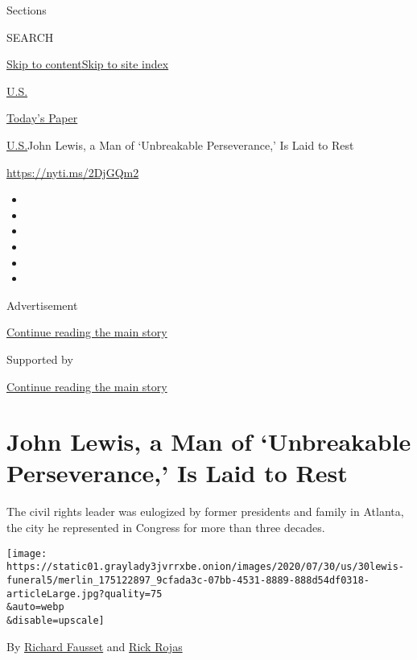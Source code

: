 Sections

SEARCH

\protect\hyperlink{site-content}{Skip to
content}\protect\hyperlink{site-index}{Skip to site index}

\href{https://www.nytimes3xbfgragh.onion/section/us}{U.S.}

\href{https://myaccount.nytimes3xbfgragh.onion/auth/login?response_type=cookie\&client_id=vi}{}

\href{https://www.nytimes3xbfgragh.onion/section/todayspaper}{Today's
Paper}

\href{/section/us}{U.S.}\textbar{}John Lewis, a Man of `Unbreakable
Perseverance,' Is Laid to Rest

\href{https://nyti.ms/2DjGQm2}{https://nyti.ms/2DjGQm2}

\begin{itemize}
\item
\item
\item
\item
\item
\item
\end{itemize}

Advertisement

\protect\hyperlink{after-top}{Continue reading the main story}

Supported by

\protect\hyperlink{after-sponsor}{Continue reading the main story}

\hypertarget{john-lewis-a-man-of-unbreakable-perseverance-is-laid-to-rest}{%
\section{John Lewis, a Man of `Unbreakable Perseverance,' Is Laid to
Rest}\label{john-lewis-a-man-of-unbreakable-perseverance-is-laid-to-rest}}

The civil rights leader was eulogized by former presidents and family in
Atlanta, the city he represented in Congress for more than three
decades.

\texttt{[image: https://static01.graylady3jvrrxbe.onion/images/2020/07/30/us/30lewis-funeral5/merlin\_175122897\_9cfada3c-07bb-4531-8889-888d54df0318-articleLarge.jpg?quality=75\\\&auto=webp\\\&disable=upscale]}

By \href{https://www.nytimes3xbfgragh.onion/by/richard-fausset}{Richard
Fausset} and
\href{https://www.nytimes3xbfgragh.onion/by/rick-rojas}{Rick Rojas}

